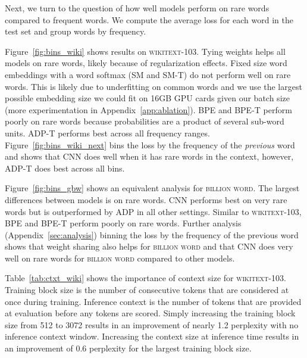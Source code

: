 \documentclass{article} \usepackage{iclr2019_conference,times}
\def\gbw{\textsc{billion word}}
\def\wiki{\textsc{wikitext-103}}
\def\sm{\textsc{SM}}
\def\smt{\textsc{SM-T}}
\def\bpe{\textsc{BPE}}
\def\bpet{\textsc{BPE-T}}
\def\cnn{\textsc{CNN}}
\def\adp{\textsc{ADP}}
\def\adpt{\textsc{ADP-T}}
\begin{document}
Next, we turn to the question of how well models perform on rare words compared to frequent words.
We compute the average loss for each word in the test set and group words by frequency.

Figure~\ref{fig:bins_wiki} shows results on \wiki{}. 
Tying weights helps all models on rare words, likely because of regularization effects. 
Fixed size word embeddings with a word softmax (\sm{} and \smt{}) do not perform well on rare words. 
This is likely due to underfitting on common words and we use the largest possible embedding size we could fit on 16GB GPU cards given our batch size (more experimentation in Appendix~\ref{app:ablation}).
\bpe{} and \bpet{} perform poorly on rare words because probabilities are a product of several sub-word units.
\adpt{} performs best across all frequency ranges.
Figure~\ref{fig:bins_wiki_next} bins the loss by the frequency of the \emph{previous} word and shows that \cnn{} does well when it has rare words in the context, however, \adpt{} does best across all bins.


Figure~\ref{fig:bins_gbw} shows an equivalent analysis for \gbw{}. 
The largest differences between models is on rare words.
\cnn{} performs best on very rare words but is outperformed by \adp{} in all other settings.
Similar to \wiki{}, \bpe{} and \bpet{} perform poorly on rare words.
Further analysis (Appendix~\ref{sec:analysis}) binning the loss by the frequency of the previous word shows that weight sharing also helps for \gbw{} and that \cnn{} does very well on rare words for \gbw{} compared to other models.

Table~\ref{tab:ctxt_wiki} shows the importance of context size for \wiki{}.
Training block size is the number of consecutive tokens that are considered at once during training.
Inference context is the number of tokens that are provided at evaluation before any tokens are scored. 
Simply increasing the training block size from 512 to 3072 results in an improvement of nearly 1.2 perplexity with no inference context window.
Increasing the context size at inference time results in an improvement of 0.6 perplexity for the largest training block size.
\end{document}

